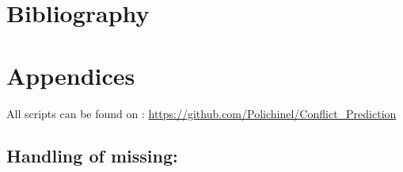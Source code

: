 \documentclass[a4paper]{article}
\begin{document}










\pagebreak

\section{Bibliography}
 


\pagebreak
\section{Appendices}

All scripts can be found on : \hyperlink{https://github.com/Polichinel/Conflict_Prediction}{https://github.com/Polichinel/Conflict\_Prediction}

\subsection{Handling of missing:}\label{missing}
\end{document}
